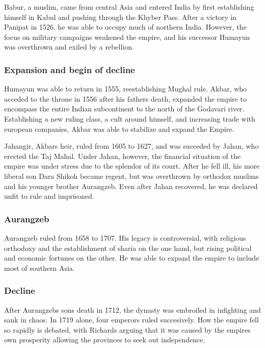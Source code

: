 \documentclass[11pt, a4paper, headings=standardclasses]{scrartcl}
\begin{document}
Babur, a muslim, came from central Asia and entered India by first establishing himself in Kabul and pushing through the Khyber Pass.
 After a victory in Panipat in 1526, he was able to occupy much of northern India. However, the focus on military campaigns weakened the empire, and his successor Humayun was overthrown and exiled by a rebellion.\autocite[Chapter 1]{richards}

\subsubsection{Expansion and begin of decline}

Humayun was able to return in 1555, reestablishing Mughal rule.\autocite[12]{richards} Akbar, who acceded to the throne in 1556 after his fathers death, expanded the empire to encompass the entire Indian subcontinent to the north of the Godavari river. Establishing a new ruling class, a cult around himself, and increasing trade with european companies, Akbar was able to stabilize and expand the Empire.\autocite[16]{richards}

Jahangir, Akbars heir, ruled from 1605 to 1627, and was succeded by Jahan, who erected the Taj Mahal. Under Jahan, however, the financial situation of the empire was under stress due to the splendor of its court.\autocite[Chapter 6]{richards} After he fell ill, his more liberal son Dara Shikoh became regent, but was overthrown by orthodox muslims and his younger brother Aurangzeb. Even after Jahan recovered, he was declared unfit to rule and imprisoned.\autocite[Chapter 7]{richards}

\subsubsection{Aurangzeb}

Aurangzeb ruled from 1658 to 1707\autocite[165]{richards}. His legacy is controversial, with religious orthodoxy and the establishment of sharia on the one hand, but rising political and economic fortunes on the other. He was able to expand the empire to include most of southern Asia.\autocite[Chapter 8]{richards}

\subsubsection{Decline}

After Aurangzebs sons death in 1712, the dynasty was embroiled in infighting and sank in chaos. In 1719 alone, four emperors ruled succesively.\autocite[Chapter 12]{richards} How the empire fell so rapidly is debated, with Richards arguing that it was caused by the empires own prosperity allowing the provinces to seek out independence.\autocite{MughalFinances}
\end{document}
